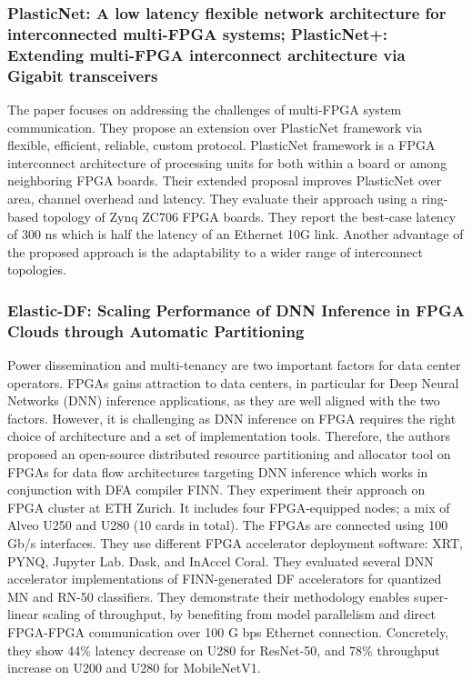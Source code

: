 \subsubsection{PlasticNet: A low latency flexible network architecture for interconnected multi-FPGA systems; PlasticNet+: Extending multi-FPGA interconnect architecture via Gigabit transceivers}
The paper focuses on addressing the challenges of multi-FPGA system communication. They propose an extension over PlasticNet framework via flexible, efficient, reliable, custom protocol. PlasticNet framework is a FPGA interconnect architecture of processing units for both within a board or among neighboring FPGA boards. Their extended proposal improves PlasticNet over area, channel overhead and latency. They evaluate their approach using a ring-based topology of Zynq ZC706 FPGA boards. They report the best-case latency of 300 ns which is half the latency of an Ethernet 10G link. Another advantage of the proposed approach is the adaptability to a wider range of interconnect topologies.

\subsubsection{Elastic-DF: Scaling Performance of DNN Inference in FPGA Clouds through Automatic Partitioning}
Power dissemination and multi-tenancy are two important factors for data center operators. FPGAs gains attraction to data centers, in particular for Deep Neural Networks (DNN) inference applications, as they are well aligned with the two factors. However, it is challenging as DNN inference on FPGA requires the right choice of architecture and a set of implementation tools. Therefore, the authors proposed an open-source distributed resource partitioning and allocator tool on FPGAs for data flow architectures targeting DNN inference which works in conjunction with DFA compiler FINN. They experiment their approach on FPGA cluster at ETH Zurich. It includes four FPGA-equipped nodes; a mix of Alveo U250 and U280 (10 cards in total). The FPGAs are connected using 100 Gb/s interfaces. They use different FPGA accelerator deployment software: XRT, PYNQ, Jupyter Lab. Dask, and InAccel Coral. They evaluated several DNN accelerator implementations of FINN-generated DF accelerators for quantized MN and RN-50 classifiers. They demonstrate their methodology enables super-linear scaling of throughput, by benefiting from model parallelism and direct FPGA-FPGA communication over 100 G bps Ethernet connection. Concretely, they show 44\% latency decrease on U280 for ResNet-50, and 78\% throughput increase on U200 and U280 for MobileNetV1.

